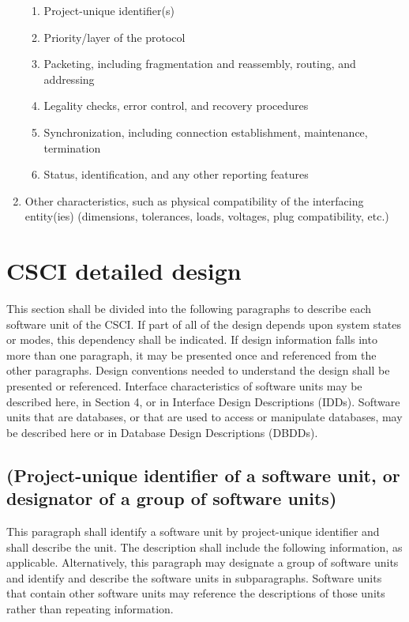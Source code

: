 \documentclass{fidata-report-template}
\begin{document}
\begin{enumerate}
  \begin{enumerate}
  \itemsep1pt\parskip0pt
  \item
    Project-unique identifier(s)
  \item
    Priority/layer of the protocol
  \item
    Packeting, including fragmentation and reassembly, routing, and
    addressing
  \item
    Legality checks, error control, and recovery procedures
  \item
    Synchronization, including connection establishment, maintenance,
    termination
  \item
    Status, identification, and any other reporting features
  \end{enumerate}
\item
  Other characteristics, such as physical compatibility of the
  interfacing entity(ies) (dimensions, tolerances, loads, voltages, plug
  compatibility, etc.)
\end{enumerate}

\section{CSCI detailed design}

This section shall be divided into the following paragraphs to describe
each software unit of the CSCI. If part of all of the design depends
upon system states or modes, this dependency shall be indicated. If
design information falls into more than one paragraph, it may be
presented once and referenced from the other paragraphs. Design
conventions needed to understand the design shall be presented or
referenced. Interface characteristics of software units may be described
here, in Section 4, or in Interface Design Descriptions (IDDs). Software
units that are databases, or that are used to access or manipulate
databases, may be described here or in Database Design Descriptions
(DBDDs).

\subsection{(Project-unique identifier of a software unit, or
designator of a group of software units)}

This paragraph shall identify a software unit by project-unique
identifier and shall describe the unit. The description shall include
the following information, as applicable. Alternatively, this paragraph
may designate a group of software units and identify and describe the
software units in subparagraphs. Software units that contain other
software units may reference the descriptions of those units rather than
repeating information.
\end{document}
